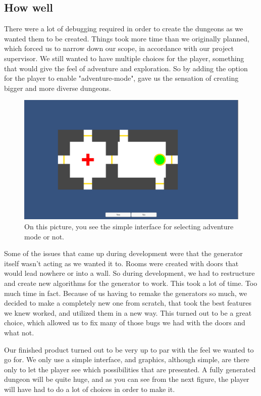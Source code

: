 \documentclass[conference,compsoc]{IEEEtran}
\begin{document}
\subsection{How well}
There were a lot of debugging required in order to create the dungeons as we wanted them to be created. Things took more time than we originally planned, which forced us to narrow down our scope, in accordance with our project supervisor. We still wanted to have multiple choices for the player, something that would give the feel of adventure and exploration. So by adding the option for the player to enable "adventure-mode", gave us the sensation of creating bigger and more diverse dungeons.
\begin{figure}[h]
	\graphicspath{{figures/}}
	\includegraphics[width = \columnwidth ]{DialogSet.png}
	\caption{On this picture, you see the simple interface for selecting adventure mode or not.}
	\label{fig:behavTree}
\end{figure}
Some of the issues that came up during development were that the generator itself wasn't acting as we wanted it to. Rooms were created with doors that would lead nowhere or into a wall. So during development, we had to restructure and create new algorithms for the generator to work. This took a lot of time. Too much time in fact. Because of us having to remake the generators so much, we decided to make a completely new one from scratch, that took the best features we knew worked, and utilized them in a new way. This turned out to be a great choice, which allowed us to fix many of those bugs we had with the doors and what not.

Our finished product turned out to be very up to par with the feel we wanted to go for. We only use a simple interface, and graphics, although simple, are there only to let the player see which possibilities that are presented. 
A fully generated dungeon will be quite huge, and as you can see from the next figure, the player will have had to do a lot of choices in order to make it. 
\end{document}
